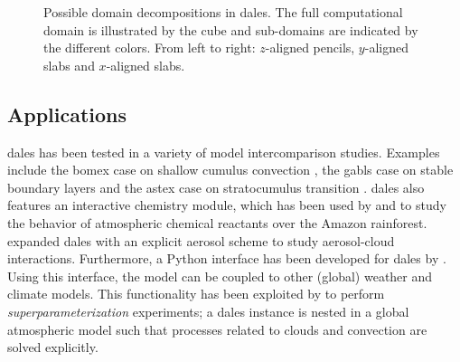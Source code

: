 \begin{figure}[H]
    \centering
    
    \caption{Possible domain decompositions in \acrshort{dales}. The full computational domain is illustrated by the cube and sub-domains are indicated by the different colors. From left to right: $z$-aligned pencils, $y$-aligned slabs and $x$-aligned slabs.}
    \label{fig:dales_domain_decomposition}
\end{figure}

\newpage

\subsection{Applications}
\acrshort{dales} has been tested in a variety of model intercomparison studies. Examples include the \acrshort{bomex} case on shallow cumulus convection \citep{siebesmaLargeEddySimulation2003}, the \acrshort{gabls} case on stable boundary layers \citep{beareIntercomparisonLargeEddySimulations2006} and the \acrshort{astex} case on stratocumulus transition \citep{vanderdussenGASSEUCLIPSEModel2013}. \acrshort{dales} also features an interactive chemistry module, which has been used by \citet{vila-gueraudearellanoRoleBoundaryLayer2011} and \citet{ouwerslootQuantifyingTransportSubcloud2013} to study the behavior of atmospheric chemical reactants over the Amazon rainforest. \citet{debruineExplicitAerosolCloud2019} expanded \acrshort{dales} with an explicit aerosol scheme to study aerosol-cloud interactions. Furthermore, a Python interface has been developed for \acrshort{dales} by \citet{vandenoordPythonInterfaceDutch2020}. Using this interface, the model can be coupled to other (global) weather and climate models. This functionality has been exploited by \citet{janssonRegionalSuperparameterizationGlobal2019} to perform \emph{superparameterization} experiments; a \acrshort{dales} instance is nested in a global atmospheric model such that processes related to clouds and convection are solved explicitly.
